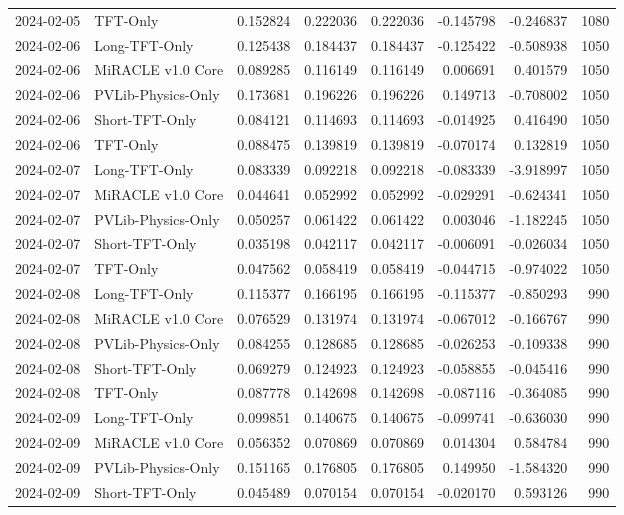 \begin{tabular}{llrrrrrr}
2024-02-05 & TFT-Only & 0.152824 & 0.222036 & 0.222036 & -0.145798 & -0.246837 & 1080 \\
2024-02-06 & Long-TFT-Only & 0.125438 & 0.184437 & 0.184437 & -0.125422 & -0.508938 & 1050 \\
2024-02-06 & MiRACLE v1.0 Core & 0.089285 & 0.116149 & 0.116149 & 0.006691 & 0.401579 & 1050 \\
2024-02-06 & PVLib-Physics-Only & 0.173681 & 0.196226 & 0.196226 & 0.149713 & -0.708002 & 1050 \\
2024-02-06 & Short-TFT-Only & 0.084121 & 0.114693 & 0.114693 & -0.014925 & 0.416490 & 1050 \\
2024-02-06 & TFT-Only & 0.088475 & 0.139819 & 0.139819 & -0.070174 & 0.132819 & 1050 \\
2024-02-07 & Long-TFT-Only & 0.083339 & 0.092218 & 0.092218 & -0.083339 & -3.918997 & 1050 \\
2024-02-07 & MiRACLE v1.0 Core & 0.044641 & 0.052992 & 0.052992 & -0.029291 & -0.624341 & 1050 \\
2024-02-07 & PVLib-Physics-Only & 0.050257 & 0.061422 & 0.061422 & 0.003046 & -1.182245 & 1050 \\
2024-02-07 & Short-TFT-Only & 0.035198 & 0.042117 & 0.042117 & -0.006091 & -0.026034 & 1050 \\
2024-02-07 & TFT-Only & 0.047562 & 0.058419 & 0.058419 & -0.044715 & -0.974022 & 1050 \\
2024-02-08 & Long-TFT-Only & 0.115377 & 0.166195 & 0.166195 & -0.115377 & -0.850293 & 990 \\
2024-02-08 & MiRACLE v1.0 Core & 0.076529 & 0.131974 & 0.131974 & -0.067012 & -0.166767 & 990 \\
2024-02-08 & PVLib-Physics-Only & 0.084255 & 0.128685 & 0.128685 & -0.026253 & -0.109338 & 990 \\
2024-02-08 & Short-TFT-Only & 0.069279 & 0.124923 & 0.124923 & -0.058855 & -0.045416 & 990 \\
2024-02-08 & TFT-Only & 0.087778 & 0.142698 & 0.142698 & -0.087116 & -0.364085 & 990 \\
2024-02-09 & Long-TFT-Only & 0.099851 & 0.140675 & 0.140675 & -0.099741 & -0.636030 & 990 \\
2024-02-09 & MiRACLE v1.0 Core & 0.056352 & 0.070869 & 0.070869 & 0.014304 & 0.584784 & 990 \\
2024-02-09 & PVLib-Physics-Only & 0.151165 & 0.176805 & 0.176805 & 0.149950 & -1.584320 & 990 \\
2024-02-09 & Short-TFT-Only & 0.045489 & 0.070154 & 0.070154 & -0.020170 & 0.593126 & 990 \\

\end{tabular}
